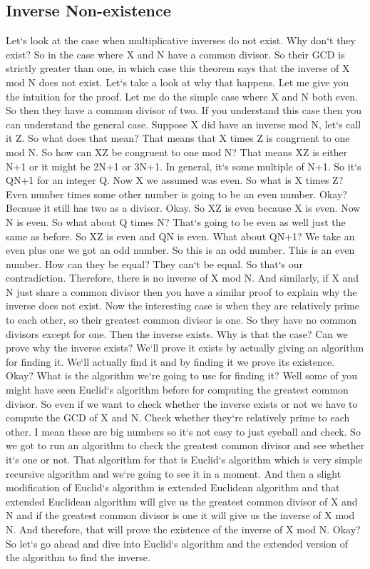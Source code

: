 \subsection{Inverse  Non-existence}
Let`s look at the case when multiplicative inverses do not exist.
Why don`t they exist? So in the case where X and N have a common divisor.
So their GCD is strictly greater than one, in which case this theorem says that the inverse of X mod N does not exist.
Let`s take a look at why that happens.
Let me give you the intuition for the proof.
Let me do the simple case where X and N both even.
So then they have a common divisor of two.
If you understand this case then you can understand the general case.
Suppose X did have an inverse mod N, let`s call it Z\@.
So what does that mean? That means that X times Z is congruent to one mod N\@.
So how can XZ be congruent to one mod N? That means XZ is either N+1 or it might be 2N+1 or 3N+1.
In general, it`s some multiple of N+1.
So it`s QN+1 for an integer Q\@.
Now X we assumed was even.
So what is X times Z? Even number times some other number is going to be an even number.
Okay? Because it still has two as a divisor.
Okay.
So XZ is even because X is even.
Now N is even.
So what about Q times N? That`s going to be even as well just the same as before.
So XZ is even and QN is even.
What about QN+1? We take an even plus one we got an odd number.
So this is an odd number.
This is an even number.
How can they be equal? They can`t be equal.
So that`s our contradiction.
Therefore, there is no inverse of X mod N\@.
And similarly, if X and N just share a common divisor then you have a similar proof to explain why the inverse does not exist.
Now the interesting case is when they are relatively prime to each other, so their greatest common divisor is one.
So they have no common divisors except for one.
Then the inverse exists.
Why is that the case? Can we prove why the inverse exists? We`ll prove it exists by actually giving an algorithm for finding it.
We`ll actually find it and by finding it we prove its existence.
Okay? What is the algorithm we`re going to use for finding it? Well some of you might have seen Euclid`s algorithm before for computing the greatest common divisor.
So even if we want to check whether the inverse exists or not we have to compute the GCD of X and N\@.
Check whether they`re relatively prime to each other.
I mean these are big numbers so it`s not easy to just eyeball and check.
So we got to run an algorithm to check the greatest common divisor and see whether it`s one or not.
That algorithm for that is Euclid`s algorithm which is very simple recursive algorithm and we`re going to see it in a moment.
And then a slight modification of Euclid`s algorithm is extended Euclidean algorithm and that extended Euclidean algorithm will give us the greatest common divisor of X and N and if the greatest common divisor is one it will give us the inverse of X mod N\@.
And therefore, that will prove the existence of the inverse of X mod N\@.
Okay? So let`s go ahead and dive into Euclid`s algorithm and the extended version of the algorithm to find the inverse.

